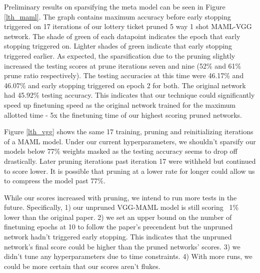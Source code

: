 \documentclass[twocolumn, 10pt]{article}
\begin{document}
Preliminary results on sparsifying the meta model can be seen in Figure \ref{lth_maml}. The graph contains maximum accuracy before early stopping triggered on 17 iterations of our lottery ticket pruned 5 way 1 shot MAML-VGG network. The shade of green of each datapoint indicates the epoch that early stopping triggered on. Lighter shades of green indicate that early stopping triggered earlier. As expected, the sparsification due to the pruning slightly increased the testing scores at prune iterations seven and nine (52\% and 61\% prune ratio respectively). The testing accuracies at this time were 46.17\% and 46.07\% and early stopping triggered on epoch 2 for both. The original network had 45.92\% testing accuracy. This indicates that our technique could significantly speed up finetuning speed as the original network trained for the maximum allotted time - 5x the finetuning time of our highest scoring pruned networks.


Figure \ref{lth_vgg} shows the same 17 training, pruning and reinitializing iterations of a MAML model. Under our current hyperparameters, we shouldn't sparsify our models below 77\% weights masked as the testing accuracy seems to drop off drastically. Later pruning iterations past iteration 17 were withheld but continued to score lower. It is possible that pruning at a lower rate for longer could allow us to compress the model past 77\%.



While our scores increased with pruning, we intend to run more tests in the future. Specifically, 1) our unpruned VGG-MAML model is still scoring ~1\% lower than the original paper. 2) we set an upper bound on the number of finetuning epochs at 10 to follow the paper's precendent but the unpruned network hadn't triggered early stopping. This indicates that the unpruned network's final score could be higher than the pruned networks' scores. 3) we didn't tune any hyperparameters due to time constraints. 4) With more runs, we could be more certain that our scores aren't flukes.

\end{document}
